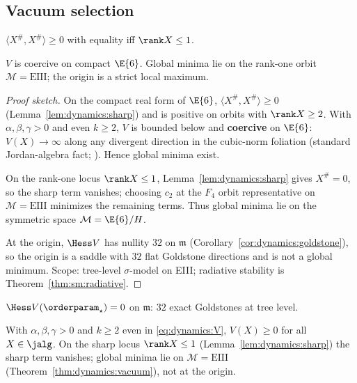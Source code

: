 \subsection{Vacuum selection}
\label{sec:dynamics:vacuum}

\begin{lemma}\label{lem:dynamics:sharp}
$\langle X^{\#},X^{\#}\rangle\geq0$ with equality iff $\rank X\leq1$.
\end{lemma}

\begin{theorem}\label{thm:dynamics:vacuum}
$V$ is coercive on compact $\E{6}$. Global minima lie on the rank-one orbit
$\mathcal{M}=\mathrm{EIII}$; the origin is a strict local maximum.
\end{theorem}

\begin{proof}[Proof sketch]
On the compact real form of $\E{6}$, $\langle X^{\#},X^{\#}\rangle\geq0$
(Lemma~\ref{lem:dynamics:sharp}) and is positive on orbits with $\rank X\geq2$.
With $\alpha,\beta,\gamma>0$ and even $k\geq2$, $V$ is bounded below and
\textbf{coercive} on $\E{6}$: $V(X)\to\infty$ along any divergent direction in
the cubic-norm foliation (standard Jordan-algebra fact;
\cite{SpringerVeldkamp2000}). Hence global minima exist.

On the rank-one locus $\rank X\leq1$, Lemma~\ref{lem:dynamics:sharp} gives
$X^{\#}=0$, so the sharp term vanishes; choosing $c_2$ at the $F_4$ orbit
representative on $\mathcal{M}=\mathrm{EIII}$ minimizes the remaining terms.
Thus global minima lie on the symmetric space $\mathcal{M}=\E{6}/H$.

At the origin, $\Hess V$ has nullity $32$ on $\mathfrak{m}$
(Corollary~\ref{cor:dynamics:goldstone}), so the origin is a saddle with $32$
flat Goldstone directions and is not a global minimum. Scope: tree-level
$\sigma$-model on EIII; radiative stability is
Theorem~\ref{thm:sm:radiative}.
\end{proof}

\begin{corollary}\label{cor:dynamics:goldstone}
$\Hess V(\orderparam_\star)=0$ on $\mathfrak{m}$: $32$ exact Goldstones at tree
level.
\end{corollary}

\begin{lemma}\label{lem:dynamics:Vnonneg}
With $\alpha,\beta,\gamma>0$ and $k\geq2$ even in \eqref{eq:dynamics:V},
$V(X)\geq0$ for all $X\in\jalg$. On the sharp locus $\rank X\leq1$
(Lemma~\ref{lem:dynamics:sharp}) the sharp term vanishes; global minima lie on
$\mathcal{M}=\mathrm{EIII}$ (Theorem~\ref{thm:dynamics:vacuum}), not at the
origin.
\end{lemma}

